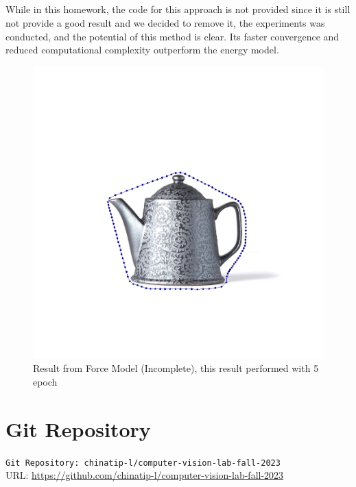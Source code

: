 \documentclass[12pt,a4paper]{report}
\begin{document}
\paragraph*{}
While in this homework, the code for this approach is not provided since it is still not provide a good result and we decided to remove it, the experiments was conducted, and the potential of this method is clear. Its faster convergence and reduced computational complexity outperform the energy model.

\begin{figure}[!htb]
    \begin{minipage}{\linewidth}
        \centering
        \includegraphics[width=\linewidth]{force_model_failed.PNG}
        \caption{Result from Force Model (Incomplete), this result performed with 5 epoch}
    \end{minipage}

\end{figure}

\clearpage

\appendix
\chapter{Git Repository}

\verb|Git Repository: chinatip-l/computer-vision-lab-fall-2023| \\
URL: \url{https://github.com/chinatip-l/computer-vision-lab-fall-2023}
\end{document}
